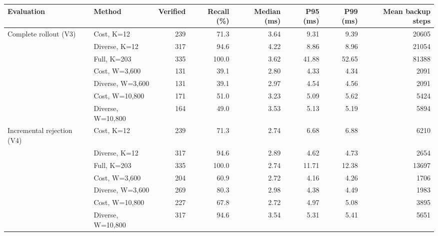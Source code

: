 \begin{tabular}{llrrrrrr}
\toprule
Evaluation & Method & Verified & Recall (\%) & Median (ms) & P95 (ms) & P99 (ms) & Mean backup steps \\
\midrule
Complete rollout (V3) & Cost, K=12 & 239 & 71.3 & 3.64 & 9.31 & 9.39 & 20605 \\
 & Diverse, K=12 & 317 & 94.6 & 4.22 & 8.86 & 8.96 & 21054 \\
 & Full, K=203 & 335 & 100.0 & 3.62 & 41.88 & 52.65 & 81388 \\
 & Cost, W=3,600 & 131 & 39.1 & 2.80 & 4.33 & 4.34 & 2091 \\
 & Diverse, W=3,600 & 131 & 39.1 & 2.97 & 4.54 & 4.56 & 2091 \\
 & Cost, W=10,800 & 171 & 51.0 & 3.23 & 5.09 & 5.62 & 5424 \\
 & Diverse, W=10,800 & 164 & 49.0 & 3.53 & 5.13 & 5.19 & 5894 \\
\midrule
Incremental rejection (V4) & Cost, K=12 & 239 & 71.3 & 2.74 & 6.68 & 6.88 & 6210 \\
 & Diverse, K=12 & 317 & 94.6 & 2.89 & 4.62 & 4.73 & 2654 \\
 & Full, K=203 & 335 & 100.0 & 2.74 & 11.71 & 12.38 & 13697 \\
 & Cost, W=3,600 & 204 & 60.9 & 2.72 & 4.16 & 4.26 & 1706 \\
 & Diverse, W=3,600 & 269 & 80.3 & 2.98 & 4.38 & 4.49 & 1983 \\
 & Cost, W=10,800 & 227 & 67.8 & 2.72 & 4.97 & 5.08 & 3895 \\
 & Diverse, W=10,800 & 317 & 94.6 & 3.54 & 5.31 & 5.41 & 5651 \\
\bottomrule
\end{tabular}
